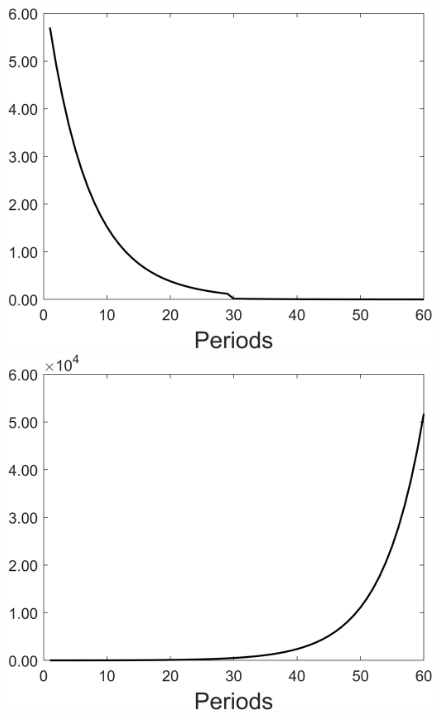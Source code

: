 \begin{figure}[h!!]
\begin{minipage}[]{0.32\textwidth}
	\end{minipage}
	\begin{minipage}[]{0.32\textwidth}
		\includegraphics[width=1\textwidth]{../codding_model/Own/figures/Rep_agent/staticonlyRam_separate_xc_periods59_eppsilon4.00_zeta1.40_Ad08_Ac04_thetac0.70_thetad0.56_HetGrowth1_tauul0.181_util0_withtarget1_lgd0.png}
	\end{minipage}
	\begin{minipage}[]{0.32\textwidth}
		\includegraphics[width=1\textwidth]{../codding_model/Own/figures/Rep_agent/staticonlyRam_separate_ydyc_periods59_eppsilon4.00_zeta1.40_Ad08_Ac04_thetac0.70_thetad0.56_HetGrowth1_tauul0.181_util0_withtarget1_lgd0.png}
	\end{minipage}
\end{figure}